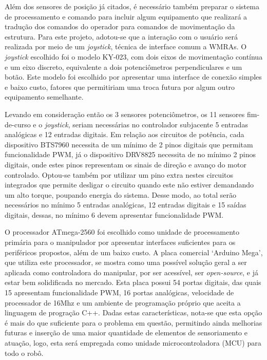 Além dos sensores de posição já citados, é necessário também preparar o 
sistema de processamento e comando para incluir algum equipamento que realizará
a tradução dos comandos do operador para comandos de movimentação da estrutura.
Para este projeto, adotou-se que a interação com o usuário será realizada por 
meio de um \textit{joystick}, técnica de interface comum a WMRAs.
O \textit{joystick} escolhido foi o modelo KY-023, 
com dois eixos de movimentação contínua e um eixo discreto, 
equivalente a dois potenciômetros perpendiculares e um botão. Este modelo 
foi escolhido por apresentar uma interface de conexão simples e baixo custo,
fatores que permitiriam uma troca futura por algum outro equipamento semelhante.

Levando em consideração então os 3 sensores potenciômetros, os 11 sensores 
fim-de-curso e o \textit{joystick}, seriam necessárias no controlador subjacente 
5 entradas analógicas e 12 entradas digitais. 
Em relação aos circuitos de potência, cada dispositivo BTS7960 necessita de um 
mínimo de 2 pinos digitais que permitam funcionalidade PWM, 
já o dispositivo DRV8825 necessita de no mínimo 2 pinos digitais, onde estes pinos 
representam os sinais de direção e avanço do motor controlado. 
Optou-se também por utilizar um pino extra nestes circuitos integrados que permite 
desligar o circuito quando este não estiver demandando um alto torque, poupando energia do sistema. 
Desse modo, ao total serão necessários no mínimo 5 entradas 
analógicas, 12 entradas digitais e 15 saídas digitais,
dessas, no mínimo 6 devem apresentar funcionalidade PWM.  

O processador ATmega-2560 foi escolhido como unidade de processamento 
primária para o manipulador por apresentar interfaces suficientes para 
os periféricos propostos, além de um baixo custo. A placa comercial 
`Arduino Mega', que utiliza este processador, se mostra como uma possível 
solução geral a ser aplicada como controladora do manipular, por ser 
acessível, ser \textit{open-source}, e já estar bem solidificada no mercado. 
Esta placa possui 54 portas digitais, das quais 15 apresentam funcionalidade 
PWM, 16 portas analógicas, velocidade 
de processador de 16Mhz e um ambiente de programação próprio que aceita a 
linguagem de progração C++. Dadas estas características, nota-se que esta 
opção é mais do que suficiente para o problema em questão, permitindo ainda 
melhorias futuras e inserção de uma maior quantidade de elementos de 
sensoriamento e atuação, logo, esta será empregada como unidade microcontroladora
(MCU) para todo o robô.


